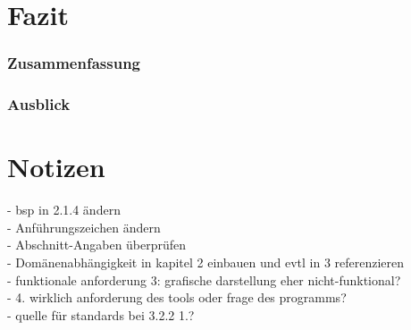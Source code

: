 \documentclass[12pt]{report}
\begin{document}
\chapter{Fazit}
\subsection{Zusammenfassung}
\subsection{Ausblick}


\chapter{Notizen}
- bsp in 2.1.4 ändern\\
- Anführungszeichen ändern\\
- Abschnitt-Angaben überprüfen\\
- Domänenabhängigkeit in kapitel 2 einbauen und evtl in 3 referenzieren\\
- funktionale anforderung 3: grafische darstellung eher nicht-funktional?\\
- 4. wirklich anforderung des tools oder frage des programms?\\
- quelle für standards bei 3.2.2 1.?\\
\end{document}
